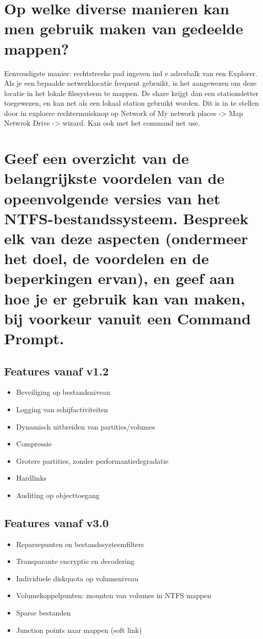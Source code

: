 \section{Op welke diverse manieren kan men gebruik maken van gedeelde mappen?}

Eenvoudigste manier: rechtstreeks pad ingeven ind e adresbalk van een Explorer.
Als je een bepaalde netwerklocatie frequent gebruikt, is het aangewezen om deze
locatie in het lokale filesysteem te mappen. De share krijgt dan een
stationsletter toegewezen, en kan net als een lokaal station gebruikt worden.
Dit is in te stellen door in exploere rechtermuisknop op Network of My network
places -> Map Netwrok Drive -> wizard. Kan ook met het command net use.

\section{Geef een overzicht van de belangrijkste voordelen van de opeenvolgende
versies van het NTFS-bestandssysteem. Bespreek elk van deze aspecten (ondermeer
het doel, de voordelen en de beperkingen ervan), en geef aan hoe je er gebruik
kan van maken, bij voorkeur vanuit een Command Prompt.}

\subsection{Features vanaf v1.2}

\begin{itemize}
	\item Beveiliging op bestandsniveau
	\item Logging van schijfactiviteiten
	\item Dynamisch uitbreiden van partities/volumes
	\item Compressie
	\item Grotere partities, zonder performantiedegradatie
	\item Hardlinks
	\item Auditing op objecttoegang
\end{itemize}

\subsection{Features vanaf v3.0}

\begin{itemize}
	\item Reparsepunten en bestandssysteemfilters
	\item Transparante encryptie en decodering
	\item Individuele diskquota op volumeniveau
	\item Volumekoppelpunten: mounten van volumes in NTFS mappen
	\item Sparse bestanden
	\item Junction points naar mappen (soft link)
\end{itemize}
